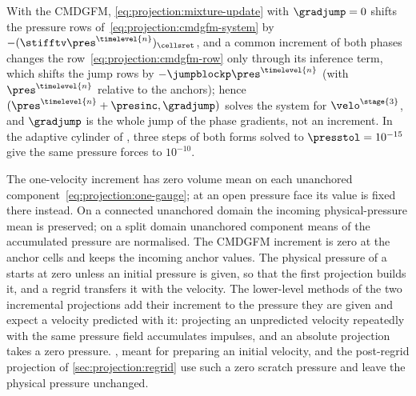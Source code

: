 With the CMDGFM, \cref{eq:projection:mixture-update} with $\gradjump=0$
shifts the pressure rows of~\cref{eq:projection:cmdgfm-system} by
$-(\stifftv\pres^{\timelevel{n}})_{\cellsret}$, and a common increment of both
phases changes the row~\cref{eq:projection:cmdgfm-row} only through its
inference term, which shifts the jump rows by $-\jumpblockp\pres^{\timelevel{n}}$
(with $\pres^{\timelevel{n}}$ relative to the anchors); hence
$(\pres^{\timelevel{n}}+\presinc,\gradjump)$ solves the system for
$\velo^{\stage{3}}$, and $\gradjump$ is the whole jump of the phase gradients,
not an increment. In the adaptive cylinder of , three steps of both
forms solved to $\presstol=10^{-15}$ give the same pressure forces to
$10^{-10}$.

The one-velocity increment has zero volume mean on each unanchored
component~\cref{eq:projection:one-gauge}; at an open pressure face its value
is fixed there instead. On a connected unanchored domain the incoming
physical-pressure mean is preserved; on a split domain unanchored component
means of the accumulated pressure are normalised. The CMDGFM increment is
zero at the anchor cells and keeps the incoming anchor values. The physical
pressure of a
 starts at zero unless an initial pressure is given,
so that the first projection builds it, and a regrid transfers it with the
velocity. The lower-level  methods of the two incremental
projections add their increment to the pressure they are given and expect a
velocity predicted with it: projecting an unpredicted velocity repeatedly
with the same pressure field accumulates impulses, and an absolute projection
takes a zero pressure. , meant for preparing an
initial velocity, and the post-regrid projection of
\cref{sec:projection:regrid} use such a zero scratch pressure and leave the
physical pressure unchanged.

